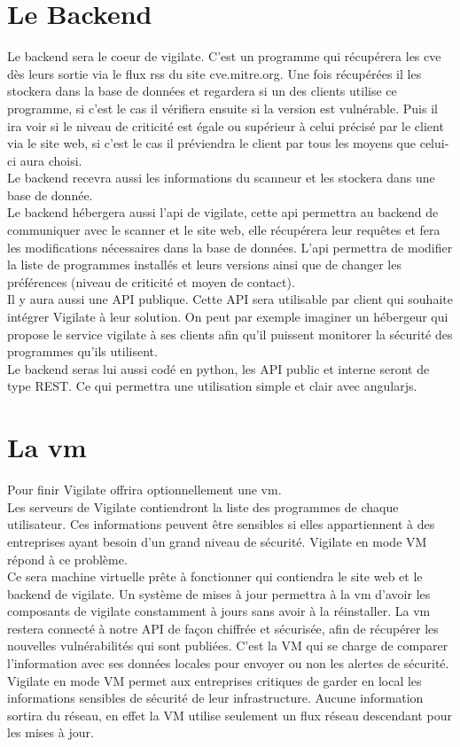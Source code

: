 \section{Le Backend}
Le backend sera le coeur de vigilate. C’est un programme qui récupérera les cve dès leurs sortie via le flux rss du site cve.mitre.org. Une fois récupérées il les stockera dans la base de données et regardera si un des clients utilise ce programme, si c’est le cas il vérifiera ensuite si la version est vulnérable. Puis il ira voir si le niveau de criticité est égale ou supérieur à celui précisé par le client via le site web, si c’est le cas il préviendra le client par tous les moyens que celui-ci aura choisi.\\
Le backend recevra aussi  les informations du scanneur et les stockera dans une base de donnée.\\
Le backend hébergera aussi l’api de vigilate, cette api permettra au backend de communiquer avec le scanner et le site web, elle récupérera leur requêtes et fera les modifications nécessaires dans la base de données. L’api permettra de modifier la liste de programmes installés et leurs versions ainsi que de changer les préférences (niveau de criticité et moyen de contact).\\
Il y aura aussi une API publique. Cette API sera utilisable par client qui souhaite intégrer Vigilate à leur solution. On peut par exemple imaginer un hébergeur qui propose le service vigilate à ses clients afin qu’il puissent monitorer la sécurité des programmes qu’ils utilisent.\\
Le backend seras lui aussi codé en python, les API public et interne seront de type REST. Ce qui permettra une utilisation simple et clair avec angularjs.\\


\section{La vm}
Pour finir Vigilate offrira optionnellement une vm.\\
Les serveurs de Vigilate contiendront la liste des programmes de chaque utilisateur. Ces informations peuvent être sensibles si elles appartiennent à des entreprises ayant besoin d’un grand niveau de sécurité. Vigilate en mode VM répond à ce problème.
\\
Ce sera machine virtuelle prête à fonctionner qui contiendra le site web et le backend de vigilate. Un système de mises à jour permettra à la vm d’avoir les composants de vigilate constamment à jours sans avoir à la réinstaller. La vm restera connecté à notre API de façon chiffrée et sécurisée, afin de récupérer les nouvelles vulnérabilités qui sont publiées. C’est la VM qui se charge de comparer l’information avec ses données locales pour envoyer ou non les alertes de sécurité.
\\
Vigilate en mode VM permet aux entreprises critiques de garder en local les informations sensibles de sécurité de leur infrastructure. Aucune information sortira du réseau, en effet la VM utilise seulement un flux réseau descendant pour les mises à jour.


